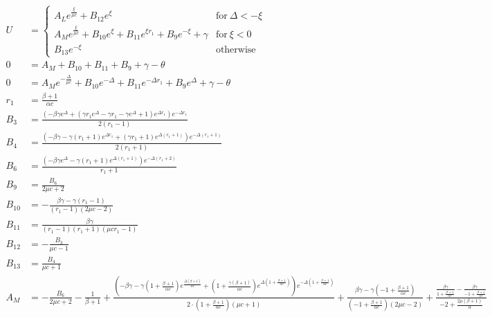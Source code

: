 \begin{align*}
U &= \begin{cases} A_{L} e^{\frac{\xi}{\mu c}} + B_{12} e^{\xi} & \text{for}\: \Delta < - \xi \\A_{M} e^{\frac{\xi}{\mu c}} + B_{10} e^{\xi} + B_{11} e^{\xi r_{1}} + B_{9} e^{- \xi} + \gamma & \text{for}\: \xi < 0 \\B_{13} e^{- \xi} & \text{otherwise} \end{cases} \\ 
0 &= A_{M} + B_{10} + B_{11} + B_{9} + \gamma - \theta \\ 
0 &= A_{M} e^{- \frac{\Delta}{\mu c}} + B_{10} e^{- \Delta} + B_{11} e^{- \Delta r_{1}} + B_{9} e^{\Delta} + \gamma - \theta \\ 
r_{1} &= \frac{\beta + 1}{\alpha c} \\ 
B_{3} &= \frac{\left(- \beta \gamma e^{\Delta} + \left(\gamma r_{1} e^{\Delta} - \gamma r_{1} - \gamma e^{\Delta} + 1\right) e^{\Delta r_{1}}\right) e^{- \Delta r_{1}}}{2 \left(r_{1} - 1\right)} \\ 
B_{4} &= \frac{\left(- \beta \gamma - \gamma \left(r_{1} + 1\right) e^{\Delta r_{1}} + \left(\gamma r_{1} + 1\right) e^{\Delta \left(r_{1} + 1\right)}\right) e^{- \Delta \left(r_{1} + 1\right)}}{2 \left(r_{1} + 1\right)} \\ 
B_{6} &= \frac{\left(- \beta \gamma e^{\Delta} - \gamma \left(r_{1} + 1\right) e^{\Delta \left(r_{1} + 1\right)}\right) e^{- \Delta \left(r_{1} + 2\right)}}{r_{1} + 1} \\ 
B_{9} &= \frac{B_{6}}{2 \mu c + 2} \\ 
B_{10} &= - \frac{\beta \gamma - \gamma \left(r_{1} - 1\right)}{\left(r_{1} - 1\right) \left(2 \mu c - 2\right)} \\ 
B_{11} &= \frac{\beta \gamma}{\left(r_{1} - 1\right) \left(r_{1} + 1\right) \left(\mu c r_{1} - 1\right)} \\ 
B_{12} &= - \frac{B_{3}}{\mu c - 1} \\ 
B_{13} &= \frac{B_{4}}{\mu c + 1} \\ 
A_{M} &= - \frac{B_{6}}{2 \mu c + 2} - \frac{1}{\beta + 1} + \frac{\left(- \beta \gamma - \gamma \left(1 + \frac{\beta + 1}{\alpha c}\right) e^{\frac{\Delta \left(\beta + 1\right)}{\alpha c}} + \left(1 + \frac{\gamma \left(\beta + 1\right)}{\alpha c}\right) e^{\Delta \left(1 + \frac{\beta + 1}{\alpha c}\right)}\right) e^{- \Delta \left(1 + \frac{\beta + 1}{\alpha c}\right)}}{2 \cdot \left(1 + \frac{\beta + 1}{\alpha c}\right) \left(\mu c + 1\right)} + \frac{\beta \gamma - \gamma \left(-1 + \frac{\beta + 1}{\alpha c}\right)}{\left(-1 + \frac{\beta + 1}{\alpha c}\right) \left(2 \mu c - 2\right)} + \frac{\frac{\beta \gamma}{1 + \frac{\beta + 1}{\alpha c}} - \frac{\beta \gamma}{-1 + \frac{\beta + 1}{\alpha c}}}{-2 + \frac{2 \mu \left(\beta + 1\right)}{\alpha}} \\ 

\end{align*}
